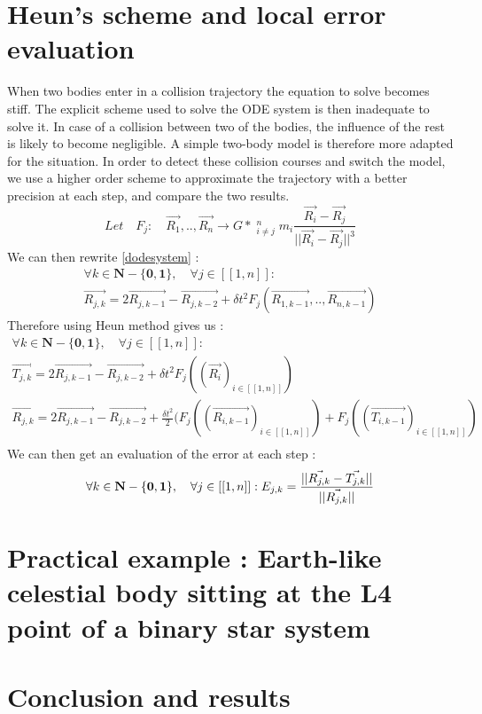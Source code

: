 \documentclass[a4paper,11pt]{article}
\begin{document}
\section{Heun's scheme and local error evaluation}
When two bodies enter in a collision trajectory the equation to solve becomes stiff.
The explicit scheme used to solve the ODE system is then inadequate to solve it.
In case of a collision between two of the bodies, the influence of the rest is
likely to become negligible. A simple two-body model is therefore more adapted
for the situation. In order to detect these collision courses and switch the
model, we use a higher order scheme to approximate the trajectory with a better
precision at each step, and compare the two results.
\begin{equation}
  Let \quad F_j: \quad \vec{R_1},..,\vec{R_n} \rightarrow G* \mathop{\sum_{i=1}}_{i \ne j}^n m_i
  \frac{\vec{R_i} - \vec{R_j}}{||{\vec{R_i} - \vec{R_j}}||^3}
  \tag{F}
\end{equation}
We can then rewrite \eqref{dodesystem} :
\begin{multline}
  \forall k \in \mathbf{N-\{0,1\}},\quad \forall j \in [[1, n]]:\\
  \vec{R_{j,k}} = 2 \vec{R_{j,k-1}} - \vec{R_{j,k-2}} +
  \delta t^2 F_j(\vec{R_{1,k-1}},..,\vec{R_{n,k-1}})
\end{multline}
Therefore using Heun method gives us :
\begin{multline}
  \forall k \in \mathbf{N-\{0,1\}},\quad \forall j \in [[1, n]]:\\
  \vec{{T}_{j,k}} = 2 \vec{R_{j,k-1}} - \vec{R_{j,k-2}} +
  \delta t^2 F_j((\vec{R_i})_{i \in [[1,n]]})\\
  \vec{{R}_{j,k}} = 2 \vec{R_{j,k-1}} - \vec{R_{j,k-2}} +
  \frac{\delta t^2}{2}(F_j((\vec{R_{i,k-1}})_{i \in [[1,n]]})+
  F_j((\vec{T_{i,k-1}})_{i \in [[1,n]]})\\
\end{multline}
We can then get an evaluation of the error at each step :
\begin{equation}
  \forall k \in \mathbf{N-\{0,1\}},\quad \forall j \in [[1, n]]:\\
  E_{j,k} = \frac{||\vec{R_{j,k}} - \vec{T_{j,k}}||}{||\vec{R_{j,k}}||}
\end{equation}

\section{Practical example : Earth-like celestial body sitting at the L4 point of
a binary star system}
\section{Conclusion and results}
\end{document}
